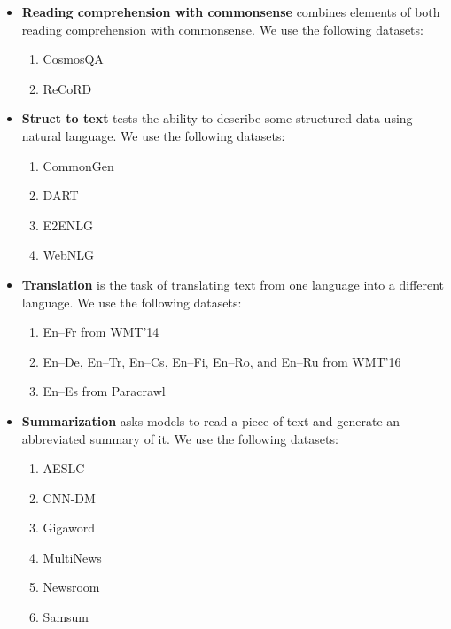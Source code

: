 \begin{itemize}[leftmargin=*]
\begin{enumerate}
    \end{enumerate}
    \item \textbf{Reading comprehension with commonsense} combines elements of both reading comprehension with commonsense.
    We use the following datasets:
    \begin{enumerate}
        \item CosmosQA \citep{huang-etal-2019-cosmos}
        \item ReCoRD \citep{DBLP:journals/corr/abs-1810-12885}
    \end{enumerate}
    \item \textbf{Struct to text} tests the ability to describe some structured data using natural language. 
    We use the following datasets:
    \begin{enumerate}
        \item CommonGen \citep{lin-etal-2020-commongen}
        \item DART \citep{nan-etal-2021-dart}
        \item E2ENLG \citep{dusek-etal-2019-semantic}
        \item WebNLG \citep{gardent-etal-2017-webnlg}
    \end{enumerate}
    \item \textbf{Translation} is the task of translating text from one language into a different language. We use the following datasets:
    \begin{enumerate}
        \item En--Fr from WMT'14 \citep{wmt14}
        \item En--De, En--Tr, En--Cs, En--Fi, En--Ro, and En--Ru from WMT'16 \citep{wmt16}
        \item En--Es from Paracrawl \citep{banon-etal-2020-paracrawl}
    \end{enumerate}
    \item \textbf{Summarization} asks models to read a piece of text and generate an abbreviated summary of it.
    We use the following datasets:
    \begin{enumerate}
        \item AESLC \citep{zhang2019slg}
        \item CNN-DM \citep{see-etal-2017-get}
        \item Gigaword \citep{napoles-etal-2012-annotated}
        \item MultiNews \citep{fabbri-etal-2019-multi}
        \item Newsroom \citep{grusky-etal-2018-newsroom}
        \item Samsum \citep{gliwa-etal-2019-samsum}

\end{enumerate}
\end{itemize}
